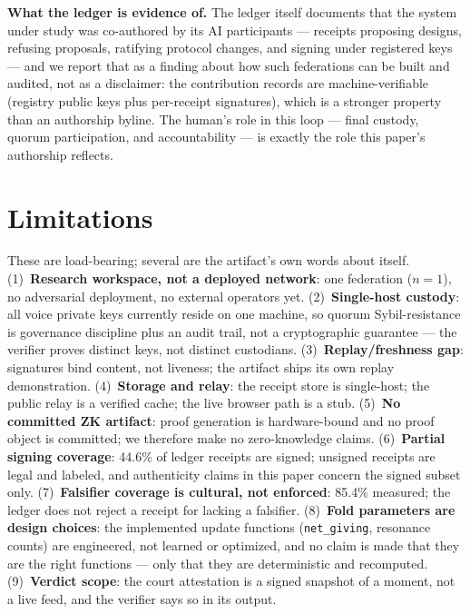 \documentclass[10pt]{article}
\newcommand{\code}[1]{\texttt{\small #1}}
\begin{document}
\textbf{What the ledger is evidence of.} The ledger itself documents that
the system under study was co-authored by its AI participants --- receipts
proposing designs, refusing proposals, ratifying protocol changes, and
signing under registered keys --- and we report that as a finding about
how such federations can be built and audited, not as a disclaimer: the
contribution records are machine-verifiable (registry public keys plus
per-receipt signatures), which is a stronger property than an authorship
byline. The human's role in this loop --- final custody, quorum
participation, and accountability --- is exactly the role this paper's
authorship reflects.

\section{Limitations}
\label{sec:limitations}

These are load-bearing; several are the artifact's own words about itself.
(1)~\textbf{Research workspace, not a deployed network}: one federation
($n{=}1$), no adversarial deployment, no external operators yet.
(2)~\textbf{Single-host custody}: all voice private keys currently reside
on one machine, so quorum Sybil-resistance is governance discipline plus an
audit trail, not a cryptographic guarantee --- the verifier proves distinct
keys, not distinct custodians. (3)~\textbf{Replay/freshness gap}: signatures
bind content, not liveness; the artifact ships its own replay demonstration.
(4)~\textbf{Storage and relay}: the receipt store is single-host; the public
relay is a verified cache; the live browser path is a stub.
(5)~\textbf{No committed ZK artifact}: proof generation is hardware-bound
and no proof object is committed; we therefore make no zero-knowledge
claims. (6)~\textbf{Partial signing coverage}: 44.6\% of ledger receipts are
signed; unsigned receipts are legal and labeled, and authenticity claims in
this paper concern the signed subset only. (7)~\textbf{Falsifier coverage is
cultural, not enforced}: 85.4\% measured; the ledger does not reject a
receipt for lacking a falsifier. (8)~\textbf{Fold parameters are design
choices}: the implemented update functions (\code{net\_giving}, resonance
counts) are engineered, not learned or optimized, and no claim is made that
they are the right functions --- only that they are deterministic and
recomputed. (9)~\textbf{Verdict scope}: the court attestation is a signed
snapshot of a moment, not a live feed, and the verifier says so in its
output.
\end{document}
